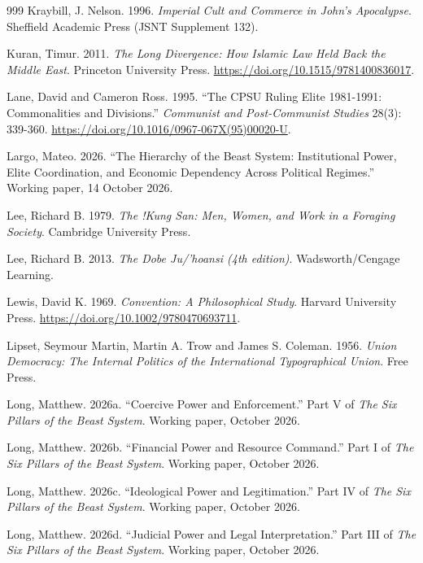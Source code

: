 \documentclass[11pt,letterpaper]{article}
\theoremstyle{definition}
\theoremstyle{remark}
\begin{document}
\begin{small}
\begin{thebibliography}{999}
Kraybill, J. Nelson. 1996. \emph{Imperial Cult and Commerce in John's Apocalypse}. Sheffield Academic Press (JSNT Supplement 132).

Kuran, Timur. 2011. \emph{The Long Divergence: How Islamic Law Held Back the Middle East}. Princeton University Press. \url{https://doi.org/10.1515/9781400836017}.

Lane, David and Cameron Ross. 1995. ``The CPSU Ruling Elite 1981-1991: Commonalities and Divisions.'' \emph{Communist and Post-Communist Studies} 28(3): 339-360. \url{https://doi.org/10.1016/0967-067X(95)00020-U}.

Largo, Mateo. 2026. ``The Hierarchy of the Beast System: Institutional Power, Elite Coordination, and Economic Dependency Across Political Regimes.'' Working paper, 14 October 2026.

Lee, Richard B. 1979. \emph{The !Kung San: Men, Women, and Work in a Foraging Society}. Cambridge University Press.

Lee, Richard B. 2013. \emph{The Dobe Ju/'hoansi (4th edition)}. Wadsworth/Cengage Learning.

Lewis, David K. 1969. \emph{Convention: A Philosophical Study}. Harvard University Press. \url{https://doi.org/10.1002/9780470693711}.

Lipset, Seymour Martin, Martin A. Trow and James S. Coleman. 1956. \emph{Union Democracy: The Internal Politics of the International Typographical Union}. Free Press.

Long, Matthew. 2026a. ``Coercive Power and Enforcement.'' Part V of \emph{The Six Pillars of the Beast System}. Working paper, October 2026.

Long, Matthew. 2026b. ``Financial Power and Resource Command.'' Part I of \emph{The Six Pillars of the Beast System}. Working paper, October 2026.

Long, Matthew. 2026c. ``Ideological Power and Legitimation.'' Part IV of \emph{The Six Pillars of the Beast System}. Working paper, October 2026.

Long, Matthew. 2026d. ``Judicial Power and Legal Interpretation.'' Part III of \emph{The Six Pillars of the Beast System}. Working paper, October 2026.


\end{thebibliography}
\end{small}
\end{document}
